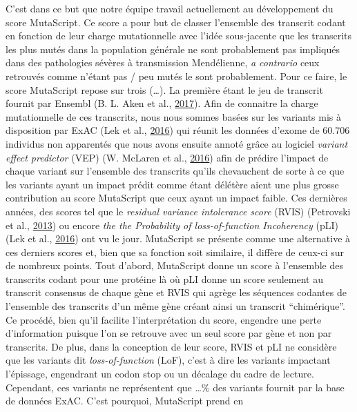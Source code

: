 \documentclass[12pt,twoside]{reedthesis}
\theoremstyle{definition}
\theoremstyle{definition}
\theoremstyle{remark}
\begin{document}
  C'est dans ce but que notre équipe travail actuellement au développement
  du score MutaScript. Ce score a pour but de classer l'ensemble des
  transcrit codant en fonction de leur charge mutationnelle avec l'idée
  sous-jacente que les transcrits les plus mutés dans la population
  générale ne sont probablement pas impliqués dans des pathologies sévères
  à transmission Mendélienne, \emph{a contrario} ceux retrouvés comme
  n'étant pas / peu mutés le sont probablement. Pour ce faire, le score
  MutaScript repose sur trois (\ldots{}). La première étant le jeu de
  transcrit fournit par Ensembl (B. L. Aken et al.,
  \protect\hyperlink{ref-Aken2017}{2017}). Afin de connaitre la charge
  mutationnelle de ces transcrits, nous nous sommes basées sur les
  variants mis à disposition par ExAC (Lek et al.,
  \protect\hyperlink{ref-Lek2016}{2016}) qui réunit les données d'exome de
  60.706 individus non apparentés que nous avons ensuite annoté grâce au
  logiciel \emph{variant effect predictor} (VEP) (W. McLaren et al.,
  \protect\hyperlink{ref-McLaren2016}{2016}) afin de prédire l'impact de
  chaque variant sur l'ensemble des transcrits qu'ils chevauchent de sorte
  à ce que les variants ayant un impact prédit comme étant délétère aient
  une plus grosse contribution au score MutaScript que ceux ayant un
  impact faible. Ces dernières années, des scores tel que le
  \emph{residual variance intolerance score} (RVIS) (Petrovski et al.,
  \protect\hyperlink{ref-Petrovski2013}{2013}) ou encore \emph{the the
  Probability of loss-of-function Incoherency} (pLI) (Lek et al.,
  \protect\hyperlink{ref-Lek2016}{2016}) ont vu le jour. MutaScript se
  présente comme une alternative à ces derniers scores et, bien que sa
  fonction soit similaire, il diffère de ceux-ci sur de nombreux points.
  Tout d'abord, MutaScript donne un score à l'ensemble des transcrits
  codant pour une protéine là où pLI donne un score seulement au transcrit
  consensus de chaque gène et RVIS qui agrège les séquences codantes de
  l'ensemble des transcrits d'un même gène créant ainsi un transcrit
  ``chimérique''. Ce procédé, bien qu'il facilite l'interprétation du
  score, engendre une perte d'information puisque l'on se retrouve avec un
  seul score par gène et non par transcrits. De plus, dans la conception
  de leur score, RVIS et pLI ne considère que les variants dit
  \emph{loss-of-function} (LoF), c'est à dire les variants impactant
  l'épissage, engendrant un codon stop ou un décalage du cadre de lecture.
  Cependant, ces variants ne représentent que \ldots{}\% des variants
  fournit par la base de données ExAC. C'est pourquoi, MutaScript prend en
\end{document}
